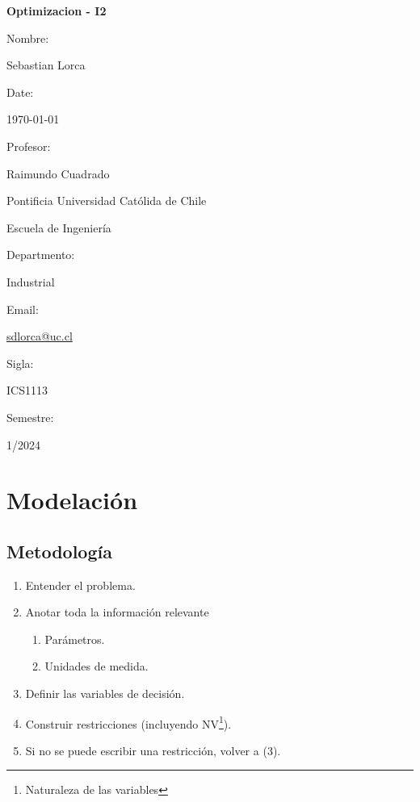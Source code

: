 \documentclass{article}
\begin{document}
\begin{titlepage}
    \centering
    \vspace*{2cm}
    {\Huge\bfseries Optimizacion - I2}\\[1cm]
    \vspace{1cm}
    {\Large Nombre: \par}
    {\large Sebastian Lorca\par}
    \vspace{0.5cm}
    {\Large Date: \par}
    {\large \today \par}
    \vspace{0.5cm}
    {\Large Profesor: \par}
    {\large Raimundo Cuadrado\par}
    \vspace{0.5cm}
    {\Large Pontificia Universidad Católida de Chile\par}
    {\large Escuela de Ingeniería\par}
    \vspace{0.5cm}
    {\Large Departmento: \par}
    {\large Industrial\par}
    \vspace{0.5cm}
    {\Large Email: \par}
    {\large \href{mailto:sdlorca@uc.cl}{sdlorca@uc.cl}\par}
    \vspace{0.5cm}
    {\Large Sigla: \par}
    {\large ICS1113\par}
    \vspace{0.5cm}
    {\Large Semestre: \par}
    {\large 1/2024\par}
    \vspace{1cm}
\end{titlepage}
\tableofcontents
\newpage


\section{Modelación}

\subsection{Metodología}

\begin{enumerate}
    \item Entender el problema.
    \item Anotar toda la información relevante
    \begin{enumerate}
        \item Parámetros.
        \item Unidades de medida.
    \end{enumerate}
    \item Definir las variables de decisión.
    \item Construir restricciones (incluyendo NV\footnote{Naturaleza de las variables}).
    \item Si no se puede escribir una restricción, volver a (3).
\end{enumerate}
\end{document}
